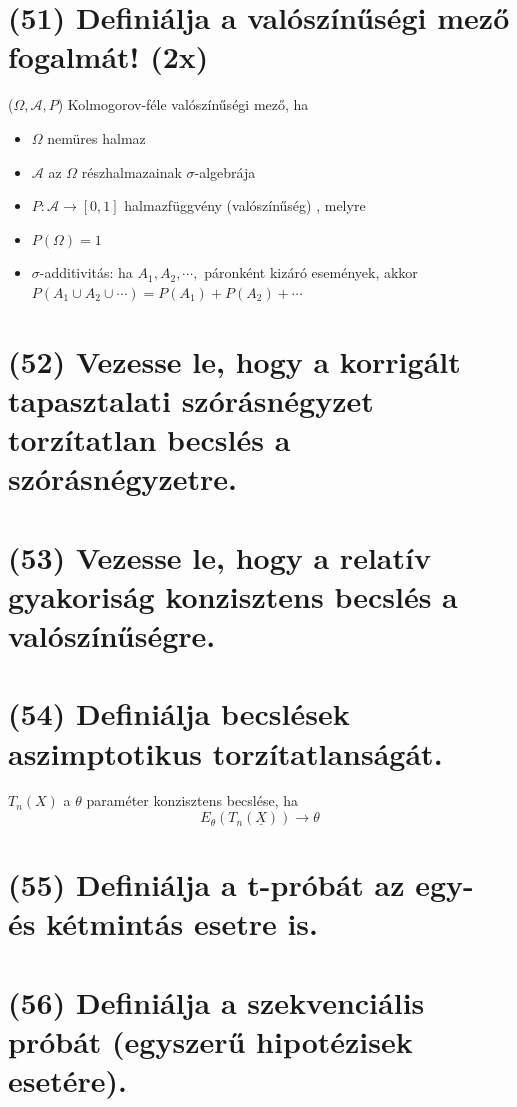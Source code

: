 \documentclass[12p]{article}
\begin{document}
\section{(51) Definiálja a valószínűségi mező fogalmát! (2x)}

($\Omega, \mathcal{A}, P$) Kolmogorov-féle
valószínűségi mező, ha
\begin{itemize}
	\item $\Omega$ nemüres halmaz
	\item $\mathcal{A}$ az $\Omega$ részhalmazainak $\sigma$-algebrája
	\item $P: \mathcal{A} \rightarrow [0, 1]$  halmazfüggvény
(valószínűség) , melyre
	\item $P(\Omega) = 1$
	\item $\sigma$-additivitás: ha $A_1, A_2,\cdots,$ páronként
kizáró események, akkor $P(A_1 \cup A_2 \cup \cdots) = P(A_1) + P(A_2) + \cdots$
\end{itemize}

\section{(52) Vezesse le, hogy a korrigált tapasztalati szórásnégyzet torzítatlan becslés a szórásnégyzetre. }

\section{(53) Vezesse le, hogy a relatív gyakoriság konzisztens becslés a valószínűségre.}

\section{(54) Definiálja becslések aszimptotikus torzítatlanságát.}

$T_n(X)$ a $\theta$ paraméter konzisztens becslése, ha
$$E_{\theta}(T_n(\underline{X})) \rightarrow \theta$$

\section{(55) Definiálja a t-próbát az egy- és kétmintás esetre is.}

\section{(56) Definiálja a szekvenciális próbát (egyszerű hipotézisek esetére).}
\end{document}
